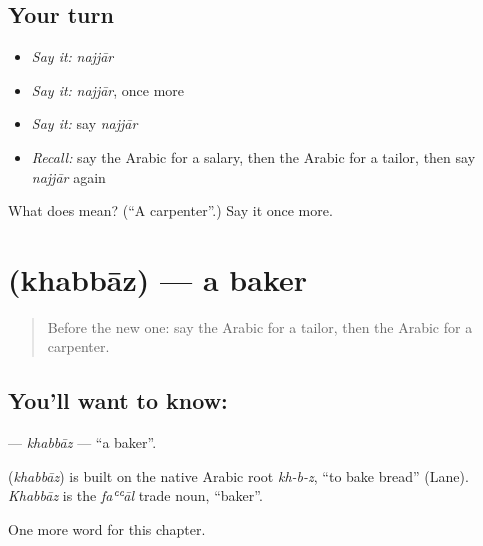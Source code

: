 \subsection*{Your turn}
\begin{itemize}
\raggedright
  \item \emph{Say it:} \emph{najjār}
  \item \emph{Say it:} \emph{najjār}, once more
  \item \emph{Say it:} say \emph{najjār}
  \item \emph{Recall:} say the Arabic for a salary, then the Arabic for a tailor, then say \emph{najjār} again
\end{itemize}

\begin{tcolorbox}[breakable,colback=teal!4,colframe=teal!35!black,title={Before you move on}]
What does  mean? (\textquotedblleft{}A carpenter\textquotedblright{}.) Say it once more.
\end{tcolorbox}
\section[\texorpdfstring{\ar{خباز} (khabbāz)}{خباز (khabbāz)}]{ (khabbāz) — a baker}

\label{lesson:AR-C144-khabbaz}



\begin{quote}
Before the new one: say the Arabic for a tailor, then the Arabic for a carpenter.
\end{quote}

\subsection*{You'll want to know: }
\textbf{} — \emph{khabbāz} — \textquotedblleft{}a baker\textquotedblright{}.

\begin{cousinweb}
\textbf{} (\emph{khabbāz}) is built on the native Arabic root \emph{kh-b-z}, \textquotedblleft{}to bake bread\textquotedblright{} (Lane). \emph{Khabbāz} is the \emph{faʿʿāl} trade noun, \textquotedblleft{}baker\textquotedblright{}.
\end{cousinweb}

\begin{grammarlens}[title={What you've built}]
One more word for this chapter.
\end{grammarlens}

